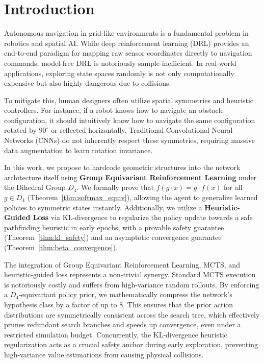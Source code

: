 \documentclass{article}
\begin{document}
\section{Introduction}
Autonomous navigation in grid-like environments is a fundamental problem in robotics and spatial AI. While deep reinforcement learning (DRL) provides an end-to-end paradigm for mapping raw sensor coordinates directly to navigation commands, model-free DRL is notoriously sample-inefficient. In real-world applications, exploring state spaces randomly is not only computationally expensive but also highly dangerous due to collisions.

To mitigate this, human designers often utilize spatial symmetries and heuristic controllers. For instance, if a robot knows how to navigate an obstacle configuration, it should intuitively know how to navigate the same configuration rotated by $90^\circ$ or reflected horizontally. Traditional Convolutional Neural Networks (CNNs) do not inherently respect these symmetries, requiring massive data augmentation to learn rotation invariance.

In this work, we propose to hardcode geometric structures into the network architecture itself using \textbf{Group Equivariant Reinforcement Learning} under the Dihedral Group $D_4$. We formally prove that $f(g \cdot x) = g \cdot f(x)$ for all $g \in D_4$ (Theorem~\ref{thm:softmax_equiv}), allowing the agent to generalize learned policies to symmetric states instantly. Additionally, we utilize a \textbf{Heuristic-Guided Loss} via KL-divergence to regularize the policy update towards a safe pathfinding heuristic in early epochs, with a provable safety guarantee (Theorem~\ref{thm:kl_safety}) and an asymptotic convergence guarantee (Theorem~\ref{thm:beta_convergence}).

The integration of Group Equivariant Reinforcement Learning, MCTS, and heuristic-guided loss represents a non-trivial synergy. Standard MCTS execution is notoriously costly and suffers from high-variance random rollouts. By enforcing a $D_4$-equivariant policy prior, we mathematically compress the network's hypothesis class by a factor of up to 8. This ensures that the prior action distributions are symmetrically consistent across the search tree, which effectively prunes redundant search branches and speeds up convergence, even under a restricted simulation budget. Concurrently, the KL-divergence heuristic regularization acts as a crucial safety anchor during early exploration, preventing high-variance value estimations from causing physical collisions.
\end{document}
